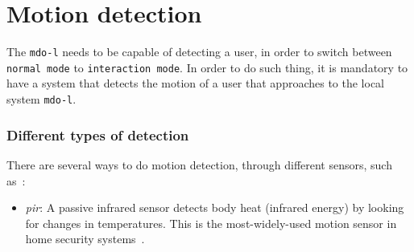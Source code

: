 %
\section{Motion detection}
\label{sec:motion-detection}
The \texttt{\gls{mdo-l}} needs to be capable of detecting a user, in order to switch between \texttt{normal mode} to \texttt{interaction mode}.
In order to do such thing, it is mandatory to have a system that detects the motion of a user that approaches to the local system \texttt{\gls{mdo-l}}.

\subsubsection{Different types of detection}
There are several ways to do motion detection, through different sensors, such as~\cite{sensors-list}:
%
\begin{itemize}
\item \emph{\gls{pir}}: A passive infrared sensor detects body heat (infrared energy) by looking for changes in temperatures. 
This is the most-widely-used motion sensor in home security systems~\cite{sensors-list}.


\end{itemize}
